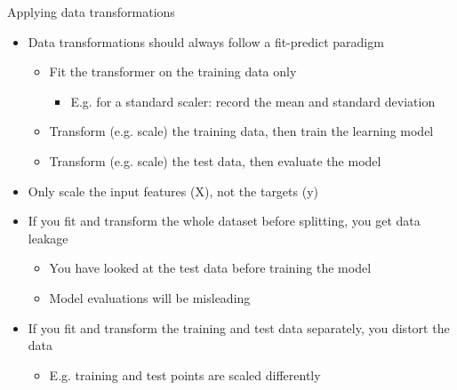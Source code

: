 \begin{frame}{Applying data transformations}
    \begin{itemize}
        \item Data transformations should always follow a fit-predict paradigm
        \begin{itemize}
            \item Fit the transformer on the training data only
            \begin{itemize}
                \item E.g. for a standard scaler: record the mean and standard deviation
            \end{itemize}
            \item Transform (e.g. scale) the training data, then train the learning model
            \item Transform (e.g. scale) the test data, then evaluate the model
        \end{itemize}
        \item Only scale the input features (X), not the targets (y)
        \item If you fit and transform the whole dataset before splitting, you get data leakage
        \begin{itemize}
            \item You have looked at the test data before training the model
            \item Model evaluations will be misleading
        \end{itemize}
        \item If you fit and transform the training and test data separately, you distort the data
        \begin{itemize}
            \item E.g. training and test points are scaled differently
        \end{itemize}
    \end{itemize}
\end{frame}




